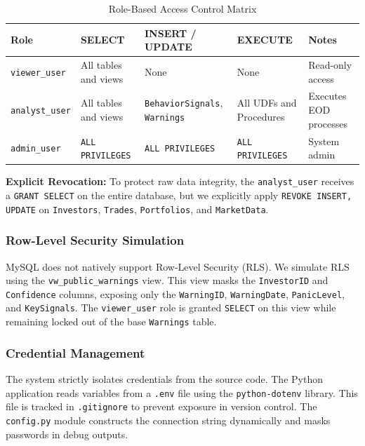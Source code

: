 \begin{table}[h!]
\centering
\begin{tabular}{|l|p{3cm}|p{3.5cm}|p{3cm}|p{2.5cm}|}
\hline
\textbf{Role} & \textbf{SELECT} & \textbf{INSERT / UPDATE} & \textbf{EXECUTE} & \textbf{Notes} \\ \hline
\texttt{viewer\_user} & All tables and views & None & None & Read-only access \\ \hline
\texttt{analyst\_user} & All tables and views & \texttt{BehaviorSignals}, \texttt{Warnings} & All UDFs and Procedures & Executes EOD processes \\ \hline
\texttt{admin\_user} & \texttt{ALL PRIVILEGES} & \texttt{ALL PRIVILEGES} & \texttt{ALL PRIVILEGES} & System admin \\ \hline
\end{tabular}
\caption{Role-Based Access Control Matrix}
\end{table}

\textbf{Explicit Revocation:} To protect raw data integrity, the \texttt{analyst\_user} receives a \texttt{GRANT SELECT} on the entire database, but we explicitly apply \texttt{REVOKE INSERT, UPDATE} on \texttt{Investors}, \texttt{Trades}, \texttt{Portfolios}, and \texttt{MarketData}.

\subsubsection{Row-Level Security Simulation}
MySQL does not natively support Row-Level Security (RLS). We simulate RLS using the \texttt{vw\_public\_warnings} view. This view masks the \texttt{InvestorID} and \texttt{Confidence} columns, exposing only the \texttt{WarningID}, \texttt{WarningDate}, \texttt{PanicLevel}, and \texttt{KeySignals}. The \texttt{viewer\_user} role is granted \texttt{SELECT} on this view while remaining locked out of the base \texttt{Warnings} table.

\subsubsection{Credential Management}
The system strictly isolates credentials from the source code. The Python application reads variables from a \texttt{.env} file using the \texttt{python-dotenv} library. This file is tracked in \texttt{.gitignore} to prevent exposure in version control. The \texttt{config.py} module constructs the connection string dynamically and masks passwords in debug outputs.

